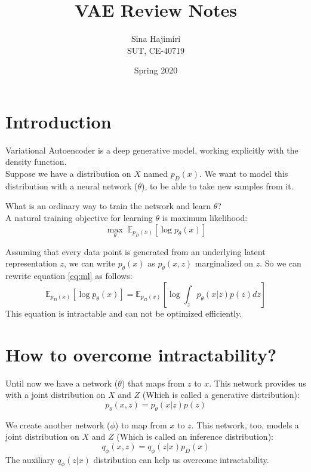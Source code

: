 \documentclass{article}
\title{VAE Review Notes}
\author{Sina Hajimiri \\SUT, CE-40719}
\date{Spring 2020}
\begin{document}
\maketitle

\section{Introduction}
Variational Autoencoder is a deep generative model, working explicitly with the density function. \\
Suppose we have a distribution on $X$ named $p_D(x)$. We want to model this distribution with a neural network ($\theta$), to be able to take new samples from it.

What is an ordinary way to train the network and learn $\theta$? \\
A natural training objective for learning $\theta$ is maximum likelihood:
\begin{equation}
    \label{eq:ml}
    \underset{\theta}{\max} \; \mathbb{E}_{p_D(x)}[\log p_\theta(x)]
\end{equation}

Assuming that every data point is generated from an underlying latent representation $z$, we can write $p_\theta(x)$ as $p_\theta(x, z)$ marginalized on $z$. So we can rewrite equation \ref{eq:ml} as follows:
\begin{equation}
    \label{eq:intractable}
    \mathbb{E}_{p_D(x)}[\log p_\theta(x)] = \mathbb{E}_{p_D(x)}[\log \int_z p_\theta(x|z) p(z) dz]
\end{equation}
This equation is intractable and can not be optimized efficiently.

\section{How to overcome intractability?}
Until now we have a network ($\theta$) that maps from $z$ to $x$. This network provides us with a joint distribution on $X$ and $Z$ (Which is called a generative distribution):
\begin{equation}
    p_\theta(x, z) = p_\theta(x|z) p(z)
\end{equation}

We create another network ($\phi$) to map from $x$ to $z$. This network, too, models a joint distribution on $X$ and $Z$ (Which is called an inference distribution):
\begin{equation}
    q_\phi(x, z) = q_\phi(z|x) p_D(x)
\end{equation}
The auxiliary $q_\phi(z|x)$ distribution can help us overcome intractability.
\end{document}
